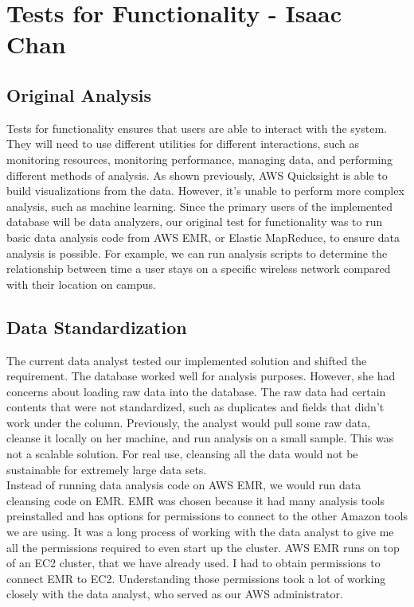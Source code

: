 \section{Tests for Functionality - Isaac Chan}
\subsection{Original Analysis}
Tests for functionality ensures that users are able to interact with the system. They will need to use different utilities for different interactions, such as monitoring resources, monitoring performance, managing data, and performing different methods of analysis. As shown previously, AWS Quicksight is able to build visualizations from the data. However, it’s unable to perform more complex analysis, such as machine learning. Since the primary users of the implemented database will be data analyzers, our original test for functionality was to run basic data analysis code from AWS EMR, or Elastic MapReduce, to ensure data analysis is possible. For example, we can run analysis scripts to determine the relationship between time a user stays on a specific wireless network compared with their location on campus. 

\subsection{Data Standardization}
The current data analyst tested our implemented solution and shifted the requirement. The database worked well for analysis purposes. However, she had concerns about loading raw data into the database. The raw data had certain contents that were not standardized, such as duplicates and fields that didn’t work under the column. Previously, the analyst would pull some raw data, cleanse it locally on her machine, and run analysis on a small sample. This was not a scalable solution. For real use, cleansing all the data would not be sustainable for extremely large data sets.\\

\noindent Instead of running data analysis code on AWS EMR, we would run data cleansing code on EMR. EMR was chosen because it had many analysis tools preinstalled and has options for permissions to connect to the other Amazon tools we are using. It was a long process of working with the data analyst to give me all the permissions required to even start up the cluster. AWS EMR runs on top of an EC2 cluster, that we have already used. I had to obtain permissions to connect EMR to EC2. Understanding those permissions took a lot of working closely with the data analyst, who served as our AWS administrator. 

